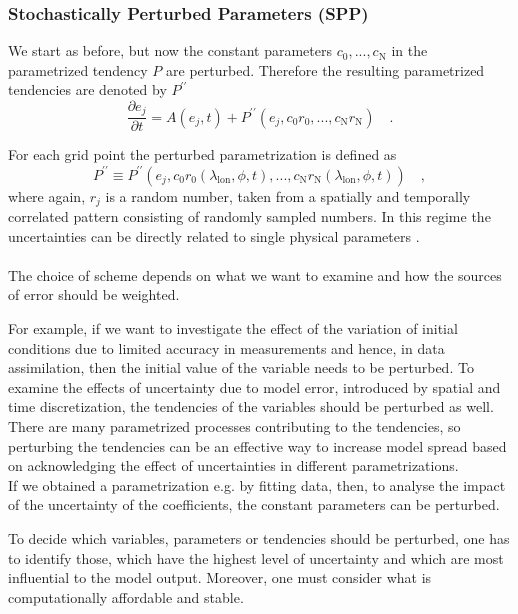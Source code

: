 \subsubsection{Stochastically Perturbed Parameters (SPP)}
We start as before, but now the constant parameters $c_{0},..., c_{\mathrm{N}}$ in the parametrized tendency $P$ are perturbed. Therefore the resulting parametrized tendencies are denoted by $P^{\prime \prime}$ 
\begin{equation}
    \frac{\partial e_{j}}{\partial t} = A(e_{j},t) + P^{\prime \prime}(e_{j},c_{0}r_{0},..., c_{\mathrm{N}}r_{\mathrm{N}}) \quad .
\end{equation}

For each grid point the perturbed parametrization is defined as
\begin{equation}
   P^{\prime \prime} \equiv  P^{\prime \prime }(e_{j}, c_{0} r_{0}(\lambda_{\mathrm{lon}}, \phi, t), ..., c_{\mathrm{N}} r_{\mathrm{N}}(\lambda_{\mathrm{lon}}, \phi, t)) \quad ,
\end{equation}
where again, $ r_{j}$ is a random number, taken from a spatially and temporally correlated
pattern consisting of randomly sampled numbers. In this regime the uncertainties can be directly related to single physical parameters \parencite{ollinaho2017towards}.\\ \\

The choice of scheme depends on what we want to examine and how the sources of error should be weighted.

For example, if we want to investigate the effect of the variation of initial conditions due to limited accuracy in measurements and hence, in data assimilation, then the initial value of the variable needs to be perturbed.
To examine the effects of uncertainty due to model error, introduced by spatial and time discretization, the tendencies of the variables should be perturbed as well. There are many parametrized processes contributing to the tendencies, so perturbing the tendencies can be an effective way to increase model spread based on acknowledging the effect of uncertainties in different parametrizations.\\

If we obtained a parametrization e.g. by fitting data, then, to analyse the impact of the uncertainty of the coefficients, the constant parameters can be perturbed.

To decide which variables, parameters or tendencies should be perturbed, one has to identify those, which have the highest level of uncertainty and which are most influential to the model output. Moreover, one must consider what is computationally affordable and stable.\\


